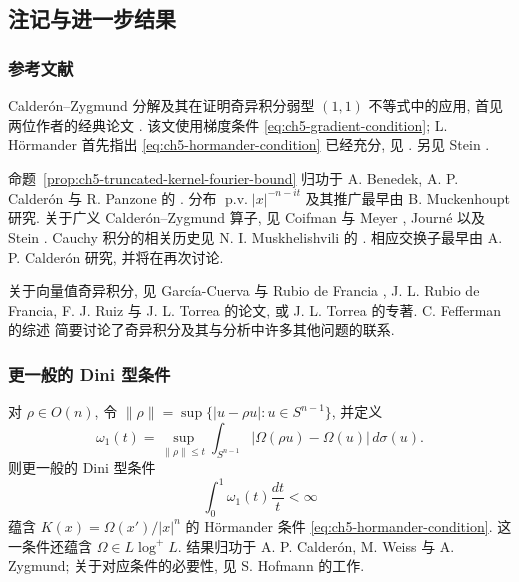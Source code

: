 \subsection{注记与进一步结果}
\label{sec:ch5-notes-further-results}

\subsubsection{参考文献}
\label{subsec:ch5-references}

Calderón--Zygmund 分解及其在证明奇异积分弱型 $(1,1)$ 不等式中的应用, 首见两位作者的经典论文 . 该文使用梯度条件 \eqref{eq:ch5-gradient-condition}; L. Hörmander 首先指出 \eqref{eq:ch5-hormander-condition} 已经充分, 见 . 另见 Stein .

命题~\ref{prop:ch5-truncated-kernel-fourier-bound} 归功于 A. Benedek, A. P. Calderón 与 R. Panzone 的 . 分布 $\operatorname{p.v.}|x|^{-n-it}$ 及其推广最早由 B. Muckenhoupt 研究. 关于广义 Calderón--Zygmund 算子, 见 Coifman 与 Meyer , Journé  以及 Stein . Cauchy 积分的相关历史见 N. I. Muskhelishvili 的 . 相应交换子最早由 A. P. Calderón 研究, 并将在再次讨论.

关于向量值奇异积分, 见 García-Cuerva 与 Rubio de Francia , J. L. Rubio de Francia, F. J. Ruiz 与 J. L. Torrea 的论文, 或 J. L. Torrea 的专著. C. Fefferman 的综述  简要讨论了奇异积分及其与分析中许多其他问题的联系.

\subsubsection{更一般的 Dini 型条件}
\label{subsec:ch5-general-dini}

\hypertarget{chapter-05-page-120}{}
对 $\rho\in O(n)$, 令 $\|\rho\|=\sup\{|u-\rho u|:u\in S^{n-1}\}$, 并定义
\[
 \omega_1(t)=\sup_{\|\rho\|\le t}
 \int_{S^{n-1}}|\Omega(\rho u)-\Omega(u)|\,d\sigma(u).
\]
则更一般的 Dini 型条件
\[
 \int_0^1\omega_1(t)\frac{dt}{t}<\infty
\]
蕴含 $K(x)=\Omega(x')/|x|^n$ 的 Hörmander 条件 \eqref{eq:ch5-hormander-condition}. 这一条件还蕴含 $\Omega\in L\log^+L$. 结果归功于 A. P. Calderón, M. Weiss 与 A. Zygmund; 关于对应条件的必要性, 见 S. Hofmann 的工作.

